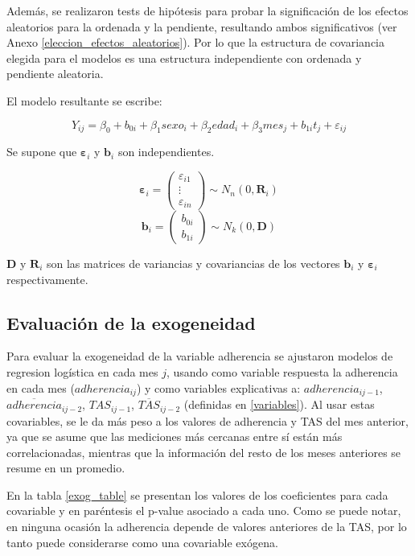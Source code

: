 \documentclass[spanish]{article}
\numberwithin{figure}{subsection}
\numberwithin{equation}{subsection}
\numberwithin{table}{subsection}
\begin{document}
Además, se realizaron tests de hipótesis para probar la significación de los
efectos aleatorios para la ordenada y la pendiente, resultando ambos
significativos (ver Anexo \ref{eleccion_efectos_aleatorios}). Por lo que la
estructura de covariancia elegida para el modelos es una estructura
independiente con ordenada y pendiente aleatoria.

El modelo resultante se escribe:

\[
	Y_{ij} = \beta_0 + b_{0i} + \beta_1 sexo_i + \beta_2 edad_i +
	\beta_3 mes_j + b_{1i} t_j + \varepsilon_{ij}
\]

Se supone que $\bm{\varepsilon}_i$ y $\bm{b}_i$ son independientes.

\[ 
	\bm{\varepsilon}_i = \begin{pmatrix} \varepsilon_{i1} \\ \vdots \\ \varepsilon_{in} \end{pmatrix} \sim N_{n}(0, \bm{R}_i)
\]
\[
	\bm{b}_i = \begin{pmatrix} b_{0i} \\ b_{1i} \end{pmatrix} \sim N_k(0, \bm{D})
\]

$\bm{D}$ y $\bm{R}_i$ son las matrices de variancias y covariancias de los
vectores $\bm{b}_i$ y $\bm{\varepsilon}_i$ respectivamente.

\subsection{Evaluación de la exogeneidad}

Para evaluar la exogeneidad de la variable adherencia se ajustaron modelos de
regresion logística en cada mes $j$, usando como variable respuesta la
adherencia en cada mes ($adherencia_{ij}$) y como variables explicativas a:
$adherencia_{ij-1}$, $\overline{adherencia}_{ij-2}$, $TAS_{ij-1}$,
$\overline{TAS}_{ij-2}$ (definidas en \ref{variables}). Al usar estas
covariables, se le da más peso a los valores de adherencia y TAS del mes
anterior, ya que se asume que las mediciones más cercanas entre sí están más
correlacionadas, mientras que la información del resto de los meses anteriores
se resume en un promedio.

En la tabla \ref{exog_table} se presentan los valores de los coeficientes para
cada covariable y en paréntesis el p-value asociado a cada uno. Como se puede
notar, en ninguna ocasión la adherencia depende de valores anteriores de la TAS,
por lo tanto puede considerarse como una covariable exógena.
\end{document}
